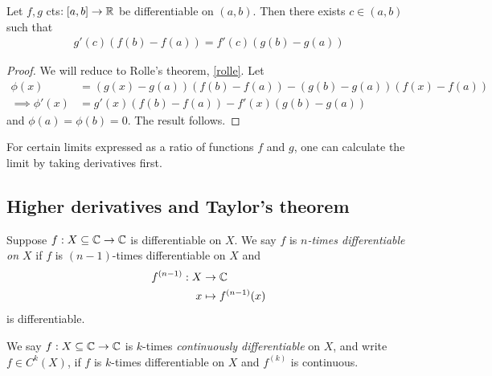\documentclass{../../template/note}
\begin{document}
    \begin{proposition}
        Let \(f, g\) cts\(:[a, b] \to \mathbb R\) be differentiable on \((a, b)\). Then there exists \(c \in (a, b)\) such that
        \begin{align*}
            g'(c) \left(f(b)-f(a)\right) = f'(c)\left(g(b)-g(a)\right)
        \end{align*}
    \end{proposition}
    
    \begin{proof}
        We will reduce to Rolle's theorem, \cref{rolle}. Let
        \begin{align*}
            \phi(x) &= \left(g(x)-g(a)\right)\left(f(b)-f(a)\right) - \left(g(b)-g(a)\right)\left(f(x)-f(a)\right) \\
            \implies \phi'(x) &= g'(x)\left(f(b)-f(a)\right) - f'(x)\left(g(b)-g(a)\right)
        \end{align*}
        and \(\phi(a) = \phi(b) = 0\). The result follows.        
    \end{proof}
    
    \begin{proposition}
        For certain limits expressed as a ratio of functions \(f\) and \(g\), one can calculate the limit by taking derivatives first.
    \end{proposition}
    

    \subsection{Higher derivatives and Taylor's theorem}
    
    \begin{definition}
        Suppose \(f: X \subseteq \mathbb C \to \mathbb C\) is differentiable on \(X\). We say \(f\) is \emph{\(n\)-times differentiable on \(X\)} if \(f\) is \((n-1)\)-times differentiable on \(X\) and
        \begin{align*}
            f^{(n-1)}: X &\to \mathbb C \\
            x &\mapsto f^{(n-1)}(x)
        \end{align*}
        is differentiable.
    \end{definition}
    
    \begin{definition}
        We say \(f: X \subseteq \mathbb C \to \mathbb C\) is \(k\)-times \emph{continuously differentiable} on \(X\), and write \(f \in C^k(X)\), if \(f\) is \(k\)-times differentiable on \(X\) and \(f^{(k)}\) is continuous.
    \end{definition}
    
\end{document}
